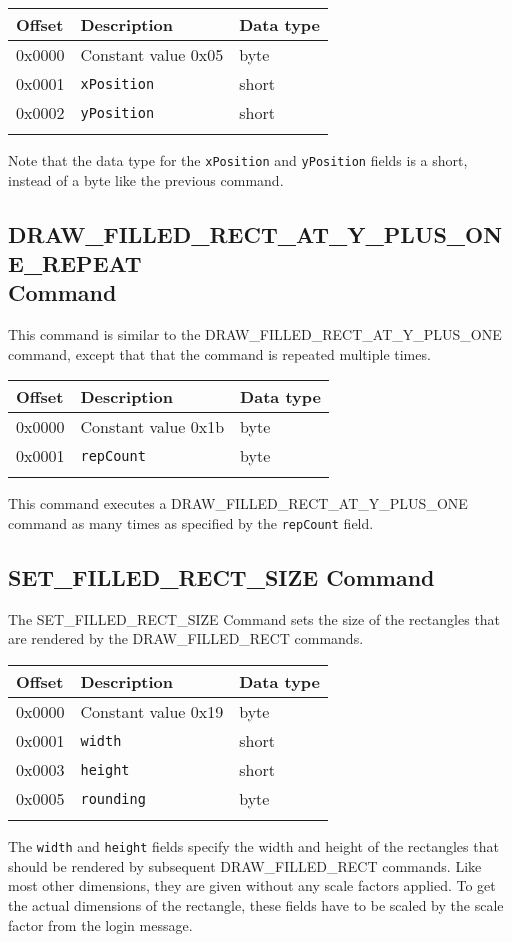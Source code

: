\documentclass{article}
\newcommand{\field}[1]{\textcolor{fieldColor}{\texttt{#1}}}
\newenvironment{bytelisting}
{\ttfamily \begin{center} \begin{tabular}{l l l} Offset & Description & Data type \\ \hline}
{\normalfont \end{tabular} \end{center}}
\begin{document}
\begin{bytelisting}
0x0000 & Constant value 0x05 & byte \\
0x0001 & \field{xPosition} & short \\
0x0002 & \field{yPosition} & short \\
\end{bytelisting}

Note that the data type for the \field{xPosition} and \field{yPosition} fields is a short, instead of a byte like the previous command.

\subsection{DRAW\_FILLED\_RECT\_AT\_Y\_PLUS\_ONE\_REPEAT \\ Command}
This command is similar to the DRAW\_FILLED\_RECT\_AT\_Y\_PLUS\_ONE command, except that that the command is repeated multiple times.

\begin{bytelisting}
0x0000 & Constant value 0x1b & byte \\
0x0001 & \field{repCount} & byte \\
\end{bytelisting}

This command executes a DRAW\_FILLED\_RECT\_AT\_Y\_PLUS\_ONE command as many times as specified by the \field{repCount} field.

\subsection{SET\_FILLED\_RECT\_SIZE Command}
The SET\_FILLED\_RECT\_SIZE Command sets the size of the rectangles that are rendered by the DRAW\_FILLED\_RECT commands.

\begin{bytelisting}
0x0000 & Constant value 0x19 & byte \\
0x0001 & \field{width} & short \\
0x0003 & \field{height} & short \\
0x0005 & \field{rounding} & byte \\
\end{bytelisting}

The \field{width} and \field{height} fields specify the width and height of the rectangles that should be rendered by subsequent DRAW\_FILLED\_RECT commands. Like most other dimensions, they are given
without any scale factors applied. To get the actual dimensions of the rectangle, these fields have to be scaled by the scale factor from the login message.
\end{document}
